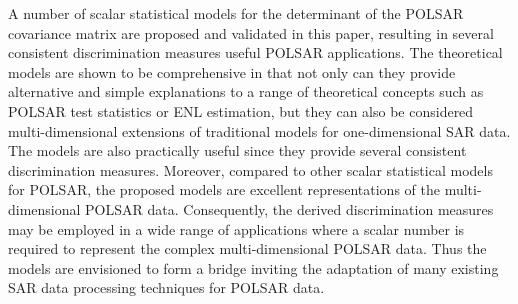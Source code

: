 \documentclass[journal,12pt,draftcls,onecolumn]{IEEEtran}
\begin{document}
A number of scalar statistical models for the determinant of the POLSAR covariance matrix are proposed and validated in this paper,
  resulting in several consistent discrimination measures useful POLSAR applications.
The theoretical models are shown to be comprehensive in that
  not only can they provide alternative and simple explanations to a range of theoretical concepts such as POLSAR test statistics or ENL estimation,
  but they can also be considered multi-dimensional extensions of traditional models for one-dimensional SAR data.
The models are also practically useful since they provide several consistent discrimination measures.
Moreover, compared to other scalar statistical models for POLSAR, the proposed models are excellent representations of the multi-dimensional POLSAR data.
Consequently, the derived discrimination measures may be employed in a wide range of applications where a scalar number is required to represent the complex multi-dimensional POLSAR data.
Thus the models are envisioned to form a bridge inviting the adaptation of many existing SAR data processing techniques for POLSAR data.

%
\end{document}
